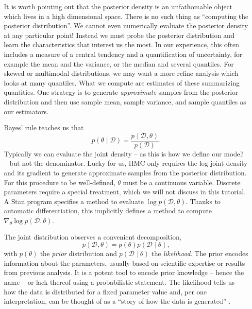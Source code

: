 It is worth pointing out that the posterior density is an unfathomable object which lives in a high dimensional space.
There is no such thing as ``computing the posterior distribution''.
We cannot even numerically evaluate the posterior density at any particular point!
Instead we must probe the posterior distribution and learn the characteristics that interest us the most.
In our experience, this often includes a measure of a central tendency and a quantification of uncertainty, for example the mean and the variance, or the median and several quantiles.
For skewed or multimodal distributions, we may want a more refine analysis which looks at many quantiles.
What we compute are estimates of these summarizing quantities.
One strategy is to generate \textit{approximate} samples from the posterior distribution and then use sample mean, sample variance, and sample quantiles as our estimators.

Bayes' rule teaches us that
\begin{equation*}
  p(\theta \mid \mathcal D) = \frac{p(\mathcal D, \theta)}{p(\mathcal D)}.
\end{equation*}
Typically we can evaluate the joint density -- as this is how we define our model! -- but not the denominator.
Lucky for us, HMC only requires the log joint density and its gradient to generate approximate samples from the posterior distribution.
For this procedure to be well-defined, $\theta$ must be a continuous variable.
Discrete parameters require a special treatment, which we will not discuss in this tutorial.
A Stan program specifies a method to evaluate $\log p(\mathcal D, \theta)$.
Thanks to automatic differentiation, this implicitly defines a method to compute $\nabla_\theta \log p(\mathcal D, \theta)$.

The joint distribution observes a convenient decomposition,
\begin{equation*}
  p(\mathcal D, \theta) = p(\theta) p(\mathcal D \mid \theta),
\end{equation*}
%
with $p(\theta)$ the \textit{prior} distribution and $p(\mathcal D \mid \theta)$ the \textit{likelihood}.
The prior encodes information about the parameters, usually based on scientific expertise or results from previous analysis.
It is a potent tool to encode prior knowledge -- hence the name -- or lack thereof using a probabilistic statement.
The likelihood tells us how the data is distributed for a fixed parameter value and, per one interpretation, can be thought of as a ``story of how the data is generated'' \cite{Gelman:2013}.

